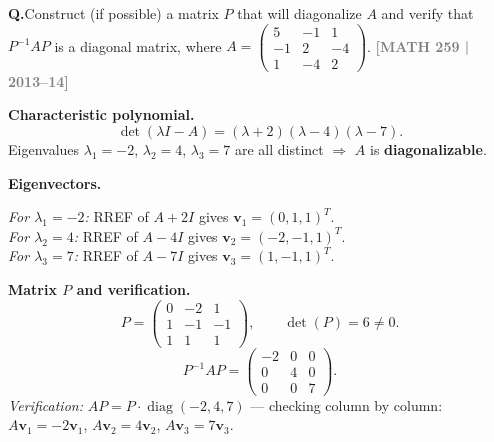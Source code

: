 \documentclass[12pt,a3paper]{article}
\newcommand{\yr}[1]{\hfill\textcolor{gray}{\small\textbf{[#1]}}}
\newcounter{qnum}
\newcommand{\Q}[1]{%
  \needspace{4\baselineskip}
  \refstepcounter{qnum}
  \vspace{6pt}
  \noindent\textbf{Q\theqnum.}\enspace #1\par
}
\begin{document}
\Q{Construct (if possible) a matrix $P$ that will diagonalize $A$ and verify that $P^{-1}AP$ is a diagonal matrix, where $A = \begin{pmatrix} 5 & -1 & 1 \\ -1 & 2 & -4 \\ 1 & -4 & 2 \end{pmatrix}$.
\yr{MATH 259 | 2013--14}}

\begin{tcolorbox}[enhanced,breakable,
  colback=cE!4,colframe=cE,boxrule=0.8pt,arc=5pt,
  title={\textbf{Answer --- Diagonalization of
    $A=\begin{pmatrix}5&-1&1\\-1&2&-4\\1&-4&2\end{pmatrix}$}},
  fonttitle=\bfseries\color{white},colbacktitle=cE]

\textbf{Characteristic polynomial.}
\[
  \det(\lambda I-A) = (\lambda+2)(\lambda-4)(\lambda-7).
\]
Eigenvalues $\lambda_1=-2$, $\lambda_2=4$, $\lambda_3=7$ are all distinct
$\Rightarrow$ $A$ is \textbf{diagonalizable}.

\medskip\textbf{Eigenvectors.}

\textit{For $\lambda_1=-2$:} RREF of $A+2I$ gives $\mathbf{v}_1=(0,1,1)^T$.\\
\textit{For $\lambda_2=4$:} RREF of $A-4I$ gives $\mathbf{v}_2=(-2,-1,1)^T$.\\
\textit{For $\lambda_3=7$:} RREF of $A-7I$ gives $\mathbf{v}_3=(1,-1,1)^T$.

\medskip\textbf{Matrix $P$ and verification.}
\[
  P=\begin{pmatrix}0&-2&1\\1&-1&-1\\1&1&1\end{pmatrix},\qquad
  \det(P)=6\neq0.
\]
\[
  \boxed{P^{-1}AP=\begin{pmatrix}-2&0&0\\0&4&0\\0&0&7\end{pmatrix}.}
\]
\textit{Verification:} $AP = P\cdot\operatorname{diag}(-2,4,7)$ — checking column by column:
$A\mathbf{v}_1=-2\mathbf{v}_1$, $A\mathbf{v}_2=4\mathbf{v}_2$, $A\mathbf{v}_3=7\mathbf{v}_3$.\;\checkmark

\end{tcolorbox}
\end{document}

